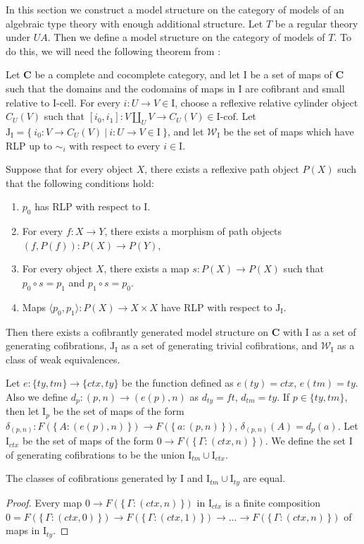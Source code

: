 \documentclass[reqno]{amsart}
\theoremstyle{definition}
\theoremstyle{remark}
\newcommand{\cat}[1]{\mathbf{#1}}
\newcommand{\C}{\cat{C}}
\newcommand{\we}{\mathcal{W}}
\newcommand{\I}{\mathrm{I}}
\newcommand{\J}{\mathrm{J}}
\newcommand{\class}[2]{#1\text{-}\mathrm{#2}}
\newcommand{\Icell}[1][\I]{\class{#1}{cell}}
\newcommand{\Icof}[1][\I]{\class{#1}{cof}}
\newcommand{\cyli}{i}
\numberwithin{figure}{section}
\begin{document}
In this section we construct a model structure on the category of models of an algebraic type theory with enough additional structure.
Let $T$ be a regular theory under $UA$.
Then we define a model structure on the category of models of $T$.
To do this, we will need the following theorem from \cite{f-model-structures}:
\begin{thm}
Let $\C$ be a complete and cocomplete category, and let $\I$ be a set of maps of $\C$
such that the domains and the codomains of maps in $\I$ are cofibrant and small relative to $\Icell$.
For every $i : U \to V \in \I$, choose a reflexive relative cylinder object $C_U(V)$
such that $[\cyli_0,\cyli_1] : V \amalg_U V \to C_U(V) \in \Icof$.
Let $\J_\I = \{\ \cyli_0 : V \to C_U(V)\ |\ i : U \to V \in \I \ \}$, and
let $\we_\I$ be the set of maps which have RLP up to $\sim_i$ with respect to every $i \in \I$.

Suppose that for every object $X$, there exists a reflexive path object $P(X)$ such that the following conditions hold:
\begin{enumerate}
\item $p_0$ has RLP with respect to $\I$.
\item For every $f : X \to Y$, there exists a morphism of path objects $(f,P(f)) : P(X) \to P(Y)$,
\item For every object $X$, there exists a map $s : P(X) \to P(X)$ such that $p_0 \circ s = p_1$ and $p_1 \circ s = p_0$.
\item Maps $\langle p_0, p_1 \rangle : P(X) \to X \times X$ have RLP with respect to $\J_\I$.
\end{enumerate}
Then there exists a cofibrantly generated model structure on $\C$ with $\I$ as a set of generating cofibrations,
$\J_\I$ as a set of generating trivial cofibrations, and $\we_\I$ as a class of weak equivalences.
\end{thm}

Let $e : \{ ty, tm \} \to \{ ctx, ty \}$ be the function defined as $e(ty) = ctx$, $e(tm) = ty$.
Also we define $d_p : (p,n) \to (e(p),n)$ as $d_{ty} = ft$, $d_{tm} = ty$.
If $p \in \{ ty, tm \}$, then let $\I_p$ be the set of maps of the form $\delta_{(p,n)} : F(\{\,A : (e(p),n)\,\}) \to F(\{\,a : (p,n)\,\})$, $\delta_{(p,n)}(A) = d_p(a)$.
Let $\I_{ctx}$ be the set of maps of the form $0 \to F(\{\,\Gamma : (ctx,n)\,\})$.
We define the set $\I$ of generating cofibrations to be the union $\I_{tm} \cup \I_{ctx}$.

\begin{prop}
The classes of cofibrations generated by $\I$ and $\I_{tm} \cup \I_{ty}$ are equal.
\end{prop}
\begin{proof}
Every map $0 \to F(\{\,\Gamma : (ctx,n)\,\})$ in $\I_{ctx}$ is a finite composition $0 = F(\{\,\Gamma : (ctx,0)\,\}) \to F(\{\,\Gamma : (ctx,1)\,\}) \to \ldots \to F(\{\,\Gamma : (ctx,n)\,\})$ of maps in $\I_{ty}$.
\end{proof}
\end{document}
